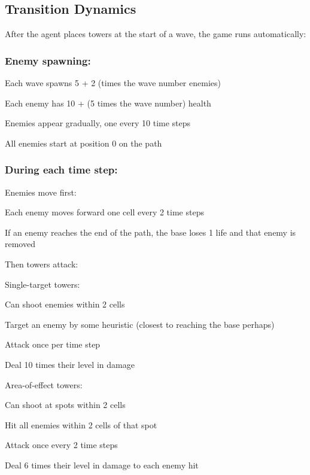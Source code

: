 \documentclass[12pt]{article}
\begin{document}
\subsection*{Transition Dynamics}

After the agent places towers at the start of a wave, the game runs automatically:

\subsubsection*{Enemy spawning:}
\begin{compactitem}
\item Each wave spawns 5 + 2 (times the wave number enemies)
\item Each enemy has 10 + (5 times the wave number) health
\item Enemies appear gradually, one every 10 time steps
\item All enemies start at position 0 on the path
\end{compactitem}

\subsubsection*{During each time step:}

Enemies move first:
\begin{compactitem}
\item Each enemy moves forward one cell every 2 time steps
\item If an enemy reaches the end of the path, the base loses 1 life and that enemy is removed
\end{compactitem}

Then towers attack:

Single-target towers:
\begin{compactitem}
\item Can shoot enemies within 2 cells
\item Target an enemy by some heuristic (closest to reaching the base perhaps)
\item Attack once per time step
\item Deal 10 times their level in damage
\end{compactitem}

Area-of-effect towers:
\begin{compactitem}
\item Can shoot at spots within 2 cells
\item Hit all enemies within 2 cells of that spot
\item Attack once every 2 time steps
\item Deal 6 times their level in damage to each enemy hit
\end{compactitem}
\end{document}
